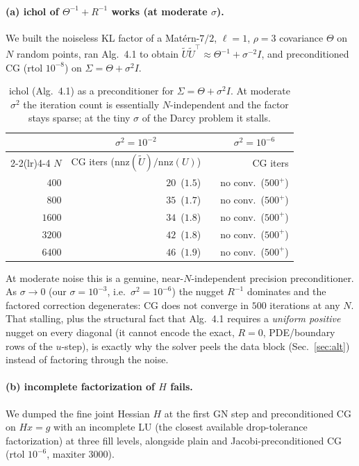 \documentclass[11pt]{article}
\newcommand{\T}{^{\!\top}}
\newcommand{\inv}{^{-1}}
\newcommand{\Th}{\Theta}
\begin{document}
\paragraph{(a) ichol of $\Th\inv+R\inv$ works (at moderate $\sigma$).} We built
the noiseless KL factor of a Matérn-$7/2$, $\ell=1$, $\rho=3$ covariance $\Th$ on
$N$ random points, ran Alg.~4.1 to obtain $\tilde U\tilde U\T\approx\Th\inv+
\sigma^{-2}I$, and preconditioned CG (rtol $10^{-8}$) on $\Sigma=\Th+\sigma^2 I$.

\begin{table}[h]
\centering
\caption{ichol (Alg.~4.1) as a preconditioner for $\Sigma=\Th+\sigma^2 I$. At
moderate $\sigma^2$ the iteration count is essentially $N$-independent and the
factor stays sparse; at the tiny $\sigma$ of the Darcy problem it stalls.}
\label{tab:ichol}
\begin{tabular}{rrrr}
\toprule
& \multicolumn{1}{c}{$\sigma^2=10^{-2}$} & & \multicolumn{1}{c}{$\sigma^2=10^{-6}$}\\
\cmidrule(lr){2-2}\cmidrule(lr){4-4}
$N$ & CG iters ($\mathrm{nnz}(\tilde U)/\mathrm{nnz}(U)$) & & CG iters \\
\midrule
$400$  & $20$ \,($1.5$)  & & no conv.\ ($500^{+}$) \\
$800$  & $35$ \,($1.7$)  & & no conv.\ ($500^{+}$) \\
$1600$ & $34$ \,($1.8$)  & & no conv.\ ($500^{+}$) \\
$3200$ & $42$ \,($1.8$)  & & no conv.\ ($500^{+}$) \\
$6400$ & $46$ \,($1.9$)  & & no conv.\ ($500^{+}$) \\
\bottomrule
\end{tabular}
\end{table}

\noindent At moderate noise this is a genuine, near-$N$-independent precision
preconditioner. As $\sigma\to0$ (our $\sigma=10^{-3}$, i.e.\ $\sigma^2=10^{-6}$)
the nugget $R\inv$ dominates and the factored correction degenerates: CG does not
converge in $500$ iterations at any $N$. That stalling, plus the structural fact
that Alg.~4.1 requires a \emph{uniform positive} nugget on every diagonal (it
cannot encode the exact, $R=0$, PDE/boundary rows of the $u$-step), is exactly
why the solver peels the data block (Sec.~\ref{sec:alt}) instead of factoring
through the noise.

\paragraph{(b) incomplete factorization of $H$ fails.} We dumped the fine joint
Hessian $H$ at the first GN step and preconditioned CG on $Hx=g$ with an
incomplete LU (the closest available drop-tolerance factorization) at three fill
levels, alongside plain and Jacobi-preconditioned CG (rtol $10^{-6}$,
maxiter $3000$).
\end{document}
